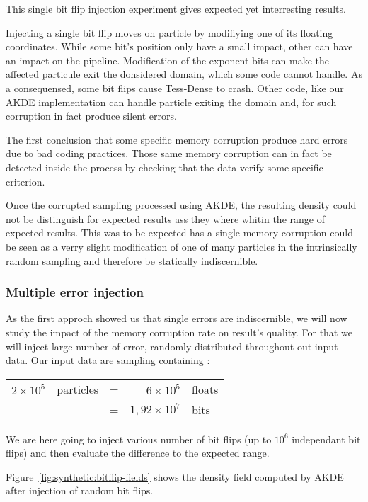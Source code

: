 \documentclass[10pt,a4paper,twoside,twocolumn]{article}
\begin{document}
This single bit flip injection experiment gives expected yet interresting
results.

Injecting a single bit flip moves on particle by modifiying one of its floating
coordinates. While some bit's position only have a small impact, other can have
an impact on the pipeline. Modification of the exponent bits can make the
affected particule exit the donsidered domain, which some code cannot handle.
As a consequensed, some bit flips cause Tess-Dense to crash. Other code, like
our AKDE implementation can handle particle exiting the domain and, for such
corruption in fact produce silent errors.

The first conclusion that some specific memory corruption produce hard errors
due to bad coding practices. Those same memory corruption can in fact be
detected inside the process by checking that the data verify some specific
criterion.

Once the corrupted sampling processed using AKDE, the resulting density could
not be distinguish for expected results ass they where whitin the range of
expected results. This was to be expected has a single memory corruption could
be seen as a verry slight modification of one of many particles in the
intrinsically random sampling and therefore be statically indiscernible.

\subsubsection{Multiple error injection}

As the first approch showed us that single errors are indiscernible, we will now
study the impact of the memory corruption rate on result's quality. For that we
will inject large number of error, randomly distributed throughout out input
data. Our input data are sampling containing :
\begin{table}[!h]
	\centering
	\begin{tabular}{rlcrl}
		$2\times10^5$	& particles	&=	& $6\times10^5$			& floats	\\
									&						&=	& $1,92\times10^7$	& bits
	\end{tabular}
\end{table}
We are here going to inject various number of bit flips (up to $10^6$
independant bit flips) and then evaluate the difference to the expected range.

Figure~\ref{fig:synthetic:bitflip-fields} shows the density field computed by AKDE after
injection of random bit flips.
\end{document}
